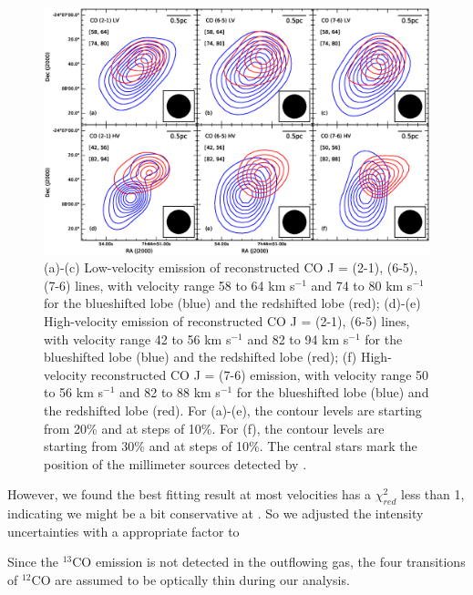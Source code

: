 
\begin{figure}
\includegraphics[scale=.6]{./fig/cvl_contour.eps}
\caption{(a)-(c) Low-velocity emission of reconstructed CO J = (2-1), (6-5), (7-6) lines, with velocity range 58 to 64 km s$^{-1} $ and 74 to 80 km s$^{-1}$ for the blueshifted lobe (blue) and the redshifted lobe (red); (d)-(e) High-velocity emission of reconstructed CO J = (2-1), (6-5) lines, with velocity range 42 to 56 km s$^{-1} $ and 82 to 94 km s$^{-1}$ for the blueshifted lobe (blue) and  the redshifted lobe (red); (f) High-velocity reconstructed CO J = (7-6) emission, with velocity range 50 to 56 km s$^{-1} $ and 82 to 88 km s$^{-1}$ for the blueshifted lobe (blue) and  the redshifted lobe (red). For (a)-(e), the contour levels are starting from 20\% and at steps of 10\%. For (f), the contour levels are starting from 30\% and at steps of 10\%. The central stars mark the position of the millimeter sources detected by \citet{2009ApJ...696...66Q}.  \label{fig2}}
\end{figure}



However, we found the best fitting result at most velocities has a $\chi^2_{red}$ less than 1, indicating we might be a bit conservative at . So we adjusted the intensity uncertainties with a appropriate factor to 



Since the $^{13}$CO emission is not detected in the outflowing gas, the four transitions of $^{12}$CO are assumed to be 
optically thin during our analysis. 